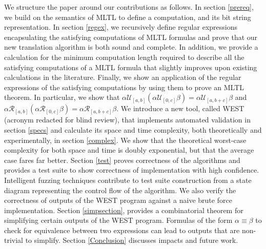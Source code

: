 \documentclass[runningheads]{llncs}
\begin{document}
We structure the paper around our contributions as follows. In section \ref{prereq}, we build on the semantics of MLTL to define a computation, and its bit string representation. %
%
In section \ref{regex}, we recursively define regular expressions encapsulating the satisfying computations of MLTL formulas and prove that our new translation algorithm is both sound and complete. In addition, we provide a calculation for the minimum computation length required to describe all the satisfying computations of a MLTL formula that slightly improves upon existing calculations in the literature. Finally, we show an application of the regular expressions of the satisfying computations by using them to prove an MLTL theorem. In particular, we show that $\alpha\mathcal{U}_{[a,b]}(\alpha\mathcal{U}_{[0,c]}\beta) = \alpha\mathcal{U}_{[a,b+c]}\beta$ and $\alpha\mathcal{R}_{[a,b]}(\alpha\mathcal{R}_{[0,c]}\beta) = \alpha\mathcal{R}_{[a,b+c]}\beta$.
%
We introduce a new tool, called WEST (acronym redacted for blind review), that implements automated validation in section \ref{specs} %
%
and calculate its space and time complexity, both theoretically and experimentally, in section \ref{complex}. We show that the theoretical worst-case complexity for both space and time is doubly exponential, but that the average case fares far better.
%
Section \ref{test} proves correctness of the algorithms and provides a test suite to show correctness of implementation with high confidence. Intelligent fuzzing techniques contribute to test suite construction from a state diagram representing the control flow of the algorithm. We also verify the correctness of outputs of the WEST program against a naive brute force implementation.
%
Section \ref{simpsection}, provides a combinatorial theorem for simplifying certain outputs of the WEST program. Formulas of the form $\alpha \equiv \beta$ to check for equivalence between two expressions can lead to outputs that are non-trivial to simplify. Section \ref{Conclusion} discusses impacts and future work. 

\end{document}
